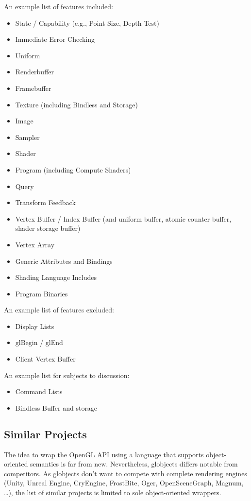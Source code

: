 \documentclass{article}
\begin{document}
An example list of features included:
\begin{itemize}
	\item State / Capability (e.g., Point Size, Depth Test)
	\item Immediate Error Checking
	\item Uniform
	\item Renderbuffer
	\item Framebuffer
	\item Texture (including Bindless and Storage)
	\item Image
	\item Sampler
	\item Shader
	\item Program (including Compute Shaders)
	\item Query
	\item Transform Feedback
	\item Vertex Buffer / Index Buffer (and uniform buffer, atomic counter buffer, shader storage buffer)
	\item Vertex Array
	\item Generic Attributes and Bindings
	\item Shading Language Includes
	\item Program Binaries
\end{itemize}

\noindent An example list of features excluded:
\begin{itemize}
	\item Display Lists
	\item glBegin / glEnd
	\item Client Vertex Buffer
\end{itemize}

\noindent An example list for subjects to discussion:
\begin{itemize}
	\item Command Lists
	\item Bindless Buffer and storage
\end{itemize}

\subsection{Similar Projects}

The idea to wrap the OpenGL API using a language that supports object-oriented semantics is far from new. Nevertheless, globjects differs notable from competitors.
As globjects don't want to compete with complete rendering engines (Unity, Unreal Engine, CryEngine, FrostBite, Oger, OpenSceneGraph, Magnum, \dots), the list of similar projects is limited to sole object-oriented wrappers.
\end{document}
